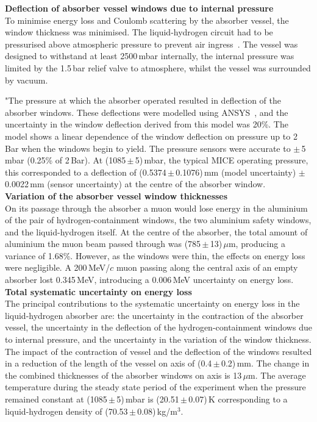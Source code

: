 \noindent\textbf{Deflection of absorber vessel windows due to internal
  pressure} \\
\noindent
To minimise energy loss and Coulomb scattering by the absorber vessel,
the window thickness was minimised.
The liquid-hydrogen circuit had to be pressurised
above atmospheric pressure to prevent air ingress~\cite{1748-0221-13-09-T09008,Ishimoto}. 
The vessel was designed to withstand at least 2500\,mbar internally, the internal pressure was limited by the 1.5\,bar relief valve to atmosphere, whilst the vessel was surrounded by vacuum.

"The pressure at which the absorber operated resulted in deflection of the absorber windows. These
deflections were modelled using ANSYS~\cite{NOTE155}, and the uncertainty in the
window deflection derived from this model was 20\%.
The model shows a linear dependence of the window deflection on
pressure up to 2\,Bar when the windows begin to yield.
The pressure sensors were accurate to $\mathrm{\pm}$\,5\,mbar
(0.25\% of 2\,Bar).
At (1085\,$\mathrm{\pm}$\,5)\,mbar, the typical MICE operating
pressure, this corresponded to a deflection of
(0.5374\,$\mathrm{\pm}$\,0.1076)\,mm (model uncertainty)
$\mathrm{\pm}$\,0.0022\,mm (sensor uncertainty) at the centre of the
absorber window. \\

\noindent\textbf{Variation of the absorber vessel window thicknesses} \\
\noindent
On its passage through the absorber a muon would lose energy in the
aluminium of the pair of hydrogen-containment windows, the two
aluminium safety windows, and the liquid-hydrogen itself.
At the centre of the absorber, the total amount of aluminium the muon
beam passed through was (785\,$\mathrm{\pm}$\,13)\,$\mu$m, producing a variance
of 1.68\%.
However, as the windows were thin, the effects on energy loss were
negligible.
A 200\,MeV/$c$ muon passing along the central axis of an empty
absorber lost 0.345\,MeV, introducing a 0.006\,MeV uncertainty
on energy loss.  \\

\noindent\textbf{Total systematic uncertainty on energy loss} \\
\noindent
The principal contributions to the systematic uncertainty on energy
loss in the liquid-hydrogen absorber are: the uncertainty in the
contraction of the absorber vessel, the uncertainty in the deflection
of the hydrogen-containment windows due to internal pressure, and the
uncertainty in the variation of the window thickness.
The impact of the contraction of vessel and the deflection of the
windows resulted in a reduction of the length of the vessel on
axis of (0.4\,$\mathrm{\pm}$\,0.2)\,mm.
The change in the combined thicknesses of the absorber
windows on axis is 13\,$\mu$m.
The average temperature during the steady state period of the
experiment when the pressure remained constant at
(1085\,$\mathrm{\pm}$\,5)\,mbar is (20.51\,$\mathrm{\pm}$\,0.07)\,K 
corresponding to a liquid-hydrogen density of (70.53\,$\mathrm{\pm}$\,0.08)\,kg/m$^{3}$.

